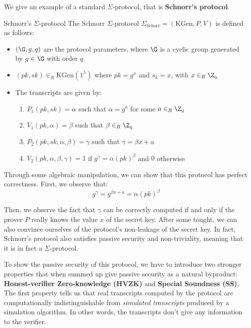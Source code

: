 \documentclass[a4paper, 12pt]{report}
\begin{document}
    We give an example of a standard $\Sigma$-protocol, that is \textbf{Schnorr's protocol}.

    \begin{framedalgo}{Schnorr's $\Sigma$-protocol}
        The Schnorr $\Sigma$-protocol $\Sigma_{\text{Schorr}} = (\mathrm{KGen}, P, V)$ is defined as follows:
        \begin{itemize}
            \item $(\G, g, q)$ are the protocol parameters, where $\G$ is a cyclic group generated by $g \in \G$ with order $q$
            \item $(pk, sk) \in_R \mathrm{KGen}(1^{\lambda})$ where $pk = g^x$ and $s_k = x$, with $x \in_R \Z_q$
            \item The transcripts are given by:
            \begin{enumerate}
                \item $P_1(pk,sk) = \alpha$ such that $\alpha = g^a$ for some $a \in_R \Z_q$
                \item $V_1(pk, \alpha) = \beta$ such that $\beta \in_R \Z_q$
                \item $P_2(pk,sk,\alpha, \beta) = \gamma$ such that $\gamma = \beta x + a$
                \item $V_2(pk, \alpha, \beta, \gamma) = 1$ if $g^\gamma = \alpha (pk)^{\beta}$ and $0$ otherwise
            \end{enumerate}
        \end{itemize}
    \end{framedalgo}

    Through some algebraic manipulation, we can show that this protocol has perfect correctness. First, we observe that:
    \[g^\gamma = g^{\beta x + a} = \alpha (pk)^\beta\]

    Then, we observe the fact that $\gamma$ can be correctly computed if and only if the prover $P$ really knows the value $x$ of the secret key. After some tought, we can also convince ourselves of the protocol's non-leakage of the secret key. In fact, Schnorr's protocol also satisfies passive security and non-triviality, meaning that it is in fact a $\Sigma$-protocol.

    To show the passive security of this protocol, we have to introduce two stronger properties that when summed up give passive security as a natural byproduct: \textbf{Honest-verifier Zero-knowledge (HVZK)} and \textbf{Special Soundness (SS)}. The first property tells us that real transcripts computed by the protocol are computationally indistinguishable from \textit{simulated transcripts} produced by a simulation algorithm. In other words, the transcripts don't give any information to the verifier.
\end{document}
